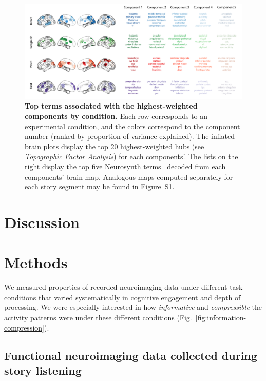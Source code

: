 \documentclass[english, 11pt]{article}
\newcommand{\synthThirds}{S1}
\begin{document}
\begin{figure}
  \centering
  \includegraphics[width=\textwidth]{figs/pca_neurosynth}

\caption{\textbf{Top terms associated with the highest-weighted components by
condition.} Each row corresponds to an experimental condition, and the colors
correspond to the component number (ranked by proportion of variance
explained). The inflated brain plots display the top 20 highest-weighted hubs
(see \textit{Topographic Factor Analysis}) for each components'. The lists on
the right display the top five Neurosynth terms~\citep{RubiEtal17} decoded from
each components' brain map. Analogous maps computed separately for each story
segment may be found in Figure~\synthThirds.}

\label{fig:neurosynth-pca}

\end{figure}



\section*{Discussion}

\section*{Methods}

We measured properties of recorded neuroimaging data under different task
conditions that varied systematically in cognitive engagement and depth of
processing. We were especially interested in how \textit{informative} and
\textit{compressible} the activity patterns were under these different
conditions (Fig.~\ref{fig:information-compression}).


\subsection*{Functional neuroimaging data collected during story
  listening}
\end{document}
